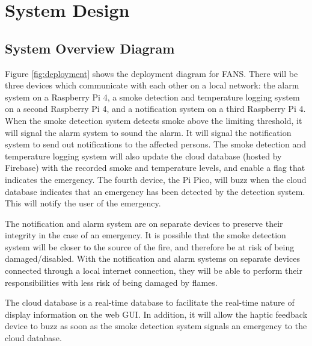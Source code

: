 \section{System Design}

\subsection{System Overview Diagram}

Figure \ref{fig:deployment} shows the deployment diagram for FANS. There will be three devices which communicate with
each other on a local network: the alarm system on a Raspberry Pi 4, a smoke detection and temperature logging system
on a second Raspberry Pi 4, and a notification system on a third Raspberry Pi 4. When the smoke detection system
detects smoke above the limiting threshold, it will signal the alarm system to sound the alarm. It will signal the
notification system to send out notifications to the affected persons. The smoke detection and temperature logging
system will also update the cloud database (hosted by Firebase) with the recorded smoke and temperature levels, and
enable a flag that indicates the emergency. The fourth device, the Pi Pico, will buzz when the cloud database indicates
that an emergency has been detected by the detection system. This will notify the user of the emergency.

The notification and alarm system are on separate devices to preserve their integrity in the case of an emergency. It
is possible that the smoke detection system will be closer to the source of the fire, and therefore be at risk of being
damaged/disabled. With the notification and alarm systems on separate devices connected through a local internet
connection, they will be able to perform their responsibilities with less risk of being damaged by flames.

The cloud database is a real-time database to facilitate the real-time nature of display information on the web GUI. In
addition, it will allow the haptic feedback device to buzz as soon as the smoke detection system signals an emergency
to the cloud database.

